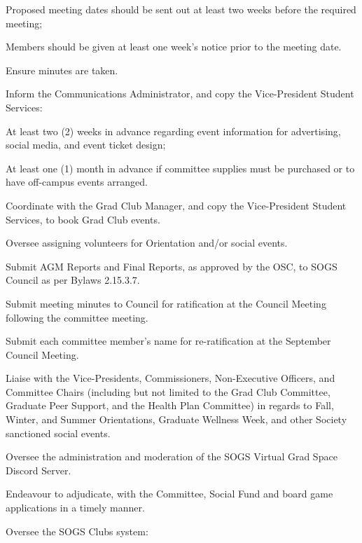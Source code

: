 \begin{longenum}[ label*=\thesubsection.\arabic*., align=left]
\begin{longenum}[label*=\arabic*., align=left]
\begin{longenum}[label*=\arabic*., align=left]
				\begin{longenum}[label*=\arabic*., align=left]
				\item Proposed meeting dates should be sent out at least two weeks before the required meeting;
				\item Members should be given at least one week's notice prior to the meeting date.
				\end{longenum}	
			\item Ensure minutes are taken.
			\item Inform the Communications Administrator, and copy the Vice-President Student Services:
				\begin{longenum}[label*=\arabic*., align=left]
				\item At least two (2) weeks in advance regarding event information for advertising, social media, and event ticket design;
				\item At least one (1) month in advance if committee supplies must be purchased or to have off-campus events arranged.
				\end{longenum}	
			\item Coordinate with the Grad Club Manager, and copy the Vice-President Student Services, to book Grad Club events.
			\item Oversee assigning volunteers for Orientation and/or social events.
			\item Submit AGM Reports and Final Reports, as approved by the OSC, to SOGS Council as per Bylaws 2.15.3.7.
			\item Submit meeting minutes to Council for ratification at the Council Meeting following the committee meeting.
			\item Submit each committee member's name for re-ratification at the September Council Meeting.		
			\item Liaise with the Vice-Presidents, Commissioners, Non-Executive Officers, and Committee Chairs (including but not limited to the Grad Club Committee, Graduate Peer Support, and the Health Plan Committee) in regards to Fall, Winter, and Summer Orientations, Graduate Wellness Week, and other Society sanctioned social events.			
			\item Oversee the administration and moderation of the SOGS Virtual Grad Space Discord Server.					
			\item Endeavour to adjudicate, with the Committee, Social Fund and board game applications in a timely manner.
			\item Oversee the SOGS Clubs system:
				\begin{longenum}[label*=\arabic*., align=left]

\end{longenum}
\end{longenum}
\end{longenum}
\end{longenum}

